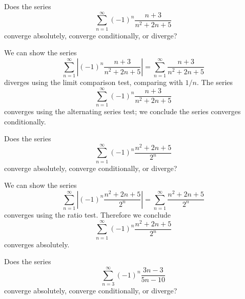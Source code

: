 \documentclass{ximera}
\begin{document}
\begin{question}
  Does the series
  \[
  \sum_{n=1}^\infty (-1)^n\frac{n+3}{n^2+2n+5}
  \]
  converge absolutely, converge conditionally, or diverge?
  \begin{prompt}
    \begin{multipleChoice}
    \end{multipleChoice}
    \begin{feedback}
      We can show the series
      \[
      \sum_{n=1}^\infty \left|(-1)^n\frac{n+3}{n^2+2n+5}\right|=
      \sum_{n=1}^\infty \frac{n+3}{n^2+2n+5}
      \]
      diverges using the limit comparison test, comparing with $1/n$.
      The series
      \[
      \sum_{n=1}^\infty (-1)^n\frac{n+3}{n^2+2n+5}
      \]
      converges using the alternating series test; we conclude the
      series converges conditionally.
    \end{feedback}
  \end{prompt}
  \begin{question}
    Does the series
    \[
    \sum_{n=1}^\infty (-1)^n\frac{n^2+2n+5}{2^n}
    \]
    converge absolutely, converge conditionally, or diverge?
    \begin{prompt}
      \begin{multipleChoice}
      \end{multipleChoice}
      \begin{feedback}
        We can show the series
        \[
        \sum_{n=1}^\infty \left|(-1)^n\frac{n^2+2n+5}{2^n}\right|=\sum_{n=1}^\infty \frac{n^2+2n+5}{2^n}
        \]
        converges using the ratio test.  Therefore we conclude
        \[
        \sum_{n=1}^\infty (-1)^n\frac{n^2+2n+5}{2^n}
        \]
        converges absolutely.
      \end{feedback}
    \end{prompt}
    \begin{question}
      Does the series
      \[
      \sum_{n=3}^\infty (-1)^n\frac{3n-3}{5n-10}
      \]
      converge absolutely, converge conditionally, or diverge?
      \begin{prompt}
        \begin{multipleChoice}

\end{multipleChoice}
\end{prompt}
\end{question}
\end{question}
\end{question}
\end{document}
